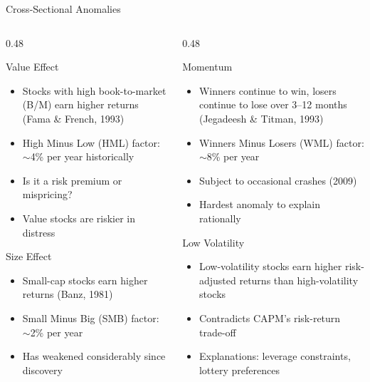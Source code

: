 \documentclass[9pt, aspectratio=169, t]{beamer}
\theoremstyle{definition}
\newenvironment{cminipage}[1]{%
    \par\noindent\hfill\begin{minipage}{#1}\ignorespaces
}{%
    \end{minipage}\hfill\null\par
}
\begin{document}
\begin{frame}{Cross-Sectional Anomalies}
\begin{cminipage}{0.95\textwidth}
\begin{columns}[T]
\begin{column}{0.48\textwidth}
\begin{block}{Value Effect}
\begin{itemize}\setlength{\itemsep}{0pt}
    \item Stocks with high book-to-market (B/M) earn higher returns (Fama \& French, 1993)
    \item High Minus Low (HML) factor: $\sim$4\% per year historically
    \item Is it a risk premium or mispricing?
    \item Value stocks are riskier in distress
\end{itemize}
\end{block}

\begin{block}{Size Effect}
\begin{itemize}\setlength{\itemsep}{0pt}
    \item Small-cap stocks earn higher returns (Banz, 1981)
    \item Small Minus Big (SMB) factor: $\sim$2\% per year
    \item Has weakened considerably since discovery
\end{itemize}
\end{block}
\end{column}
\begin{column}{0.48\textwidth}
\begin{block}{Momentum}
\begin{itemize}\setlength{\itemsep}{0pt}
    \item Winners continue to win, losers continue to lose over 3--12 months (Jegadeesh \& Titman, 1993)
    \item Winners Minus Losers (WML) factor: $\sim$8\% per year
    \item Subject to occasional crashes (2009)
    \item Hardest anomaly to explain rationally
\end{itemize}
\end{block}

\begin{block}{Low Volatility}
\begin{itemize}\setlength{\itemsep}{0pt}
    \item Low-volatility stocks earn higher risk-adjusted returns than high-volatility stocks
    \item Contradicts CAPM's risk-return trade-off
    \item Explanations: leverage constraints, lottery preferences
\end{itemize}
\end{block}
\end{column}
\end{columns}
\end{cminipage}
\end{frame}
\end{document}
